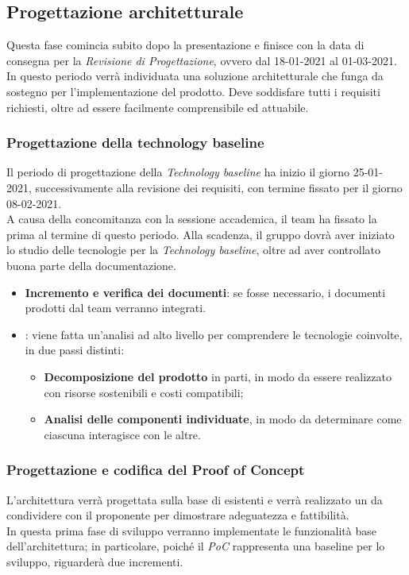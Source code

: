 \subsection{Progettazione architetturale}
Questa fase comincia subito dopo la presentazione e finisce con la data di consegna per la \textit{Revisione di Progettazione}, ovvero dal 18-01-2021 al 01-03-2021.\\
In questo periodo verrà individuata una soluzione architetturale che funga da sostegno per l'implementazione del prodotto. Deve soddisfare tutti i requisiti richiesti, oltre ad essere facilmente comprensibile ed attuabile. 

\subsubsection{Progettazione della technology baseline}

Il periodo di progettazione della \textit{Technology baseline} ha inizio il giorno 25-01-2021, successivamente alla revisione dei requisiti, con termine fissato per il giorno 08-02-2021. \\ A causa della concomitanza con la sessione accademica, il team ha fissato la prima  al termine di questo periodo. Alla scadenza, il gruppo dovrà aver iniziato lo studio delle tecnologie per la \textit{Technology baseline}, oltre ad aver controllato buona parte della documentazione.

\begin{itemize}
\item \textbf{Incremento e verifica dei documenti}: se fosse necessario, i documenti prodotti dal team verranno integrati.

 \item {}: viene fatta un'analisi ad alto livello per comprendere le tecnologie coinvolte, in due passi distinti:
\begin{itemize}
 \item \textbf{Decomposizione del prodotto} in parti, in modo da essere realizzato con risorse sostenibili e costi compatibili;
 \item \textbf{Analisi delle componenti individuate}, in modo da determinare come ciascuna interagisce con le altre.  
 
\end{itemize}
\end{itemize}

\subsubsection{Progettazione e codifica del Proof of Concept}
L'architettura verrà progettata sulla base di  esistenti e verrà realizzato un  da condividere con il proponente per dimostrare adeguatezza e fattibilità. \\ 
In questa prima fase di sviluppo verranno implementate le funzionalità base dell'architettura; in particolare, poiché il \textit{PoC} rappresenta una baseline per lo sviluppo, riguarderà due incrementi.

